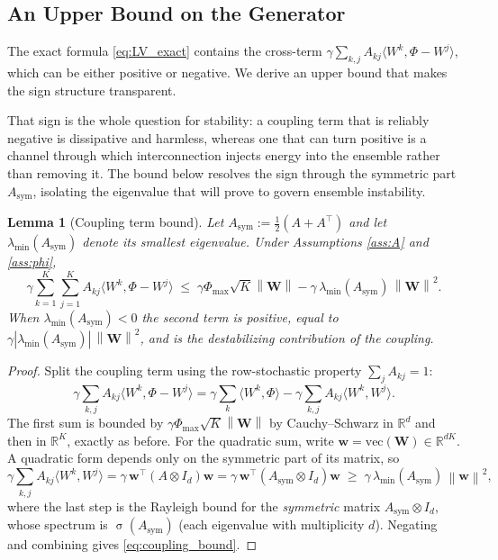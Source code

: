 \documentclass[12pt]{article}
\theoremstyle{plain}
\newtheorem{lemma}[theorem]{Lemma}
\theoremstyle{definition}
\DeclareMathOperator{\spec}{\sigma}
\newcommand{\R}{\mathbb{R}}
\newcommand{\W}{\mathbf{W}}
\newcommand{\norm}[1]{\left\lVert #1 \right\rVert}
\newcommand{\abs}[1]{\left| #1 \right|}
\newcommand{\ip}[2]{\langle #1, #2 \rangle}
\begin{document}
\subsection{An Upper Bound on the Generator}

The exact formula \eqref{eq:LV_exact} contains the cross-term
$\gamma \sum_{k,j} A_{kj}\ip{W^k}{\Phi - W^j}$, which can be either
positive or negative.  We derive an upper bound that makes the
sign structure transparent.

That sign is the whole question for stability: a coupling term that is reliably negative is dissipative and harmless, whereas one that can turn positive is a channel through which interconnection injects energy into the ensemble rather than removing it. The bound below resolves the sign through the symmetric part $A_{\mathrm{sym}}$, isolating the eigenvalue that will prove to govern ensemble instability.

\begin{lemma}[Coupling term bound]
  \label{lem:coupling_bound}
  Let $A_{\mathrm{sym}} := \tfrac{1}{2}(A + A^\top)$ and let
  $\lambda_{\min}(A_{\mathrm{sym}})$ denote its smallest eigenvalue.
  Under Assumptions \ref{ass:A} and \ref{ass:phi},
  \begin{equation}
    \gamma \sum_{k=1}^K \sum_{j=1}^K A_{kj} \ip{W^k}{\Phi - W^j}
    \;\leq\;
    \gamma \Phi_{\max} \sqrt{K} \norm{\W}
    - \gamma\, \lambda_{\min}(A_{\mathrm{sym}})\, \norm{\W}^2.
    \label{eq:coupling_bound}
  \end{equation}
  When $\lambda_{\min}(A_{\mathrm{sym}}) < 0$ the second term is
  \emph{positive}, equal to
  $\gamma\abs{\lambda_{\min}(A_{\mathrm{sym}})}\,\norm{\W}^2$, and is the
  destabilizing contribution of the coupling.
\end{lemma}

\begin{proof}
  Split the coupling term using the row-stochastic property
  $\sum_j A_{kj}=1$:
  \[
    \gamma \sum_{k,j} A_{kj} \ip{W^k}{\Phi - W^j}
    = \gamma \sum_{k} \ip{W^k}{\Phi}
      - \gamma \sum_{k,j} A_{kj} \ip{W^k}{W^j}.
  \]
  The first sum is bounded by $\gamma \Phi_{\max} \sqrt{K} \norm{\W}$
  by Cauchy--Schwarz in $\R^d$ and then in $\R^K$, exactly as before.
  For the quadratic sum, write $\mathbf{w} = \mathrm{vec}(\W) \in \R^{dK}$.
  A quadratic form depends only on the symmetric part of its matrix, so
  \[
    \gamma \sum_{k,j} A_{kj} \ip{W^k}{W^j}
    = \gamma\, \mathbf{w}^\top (A \otimes I_d) \mathbf{w}
    = \gamma\, \mathbf{w}^\top (A_{\mathrm{sym}} \otimes I_d) \mathbf{w}
    \;\geq\; \gamma\, \lambda_{\min}(A_{\mathrm{sym}})\, \norm{\mathbf{w}}^2,
  \]
  where the last step is the Rayleigh bound for the \emph{symmetric}
  matrix $A_{\mathrm{sym}} \otimes I_d$, whose spectrum is
  $\spec(A_{\mathrm{sym}})$ (each eigenvalue with multiplicity $d$).
  Negating and combining gives \eqref{eq:coupling_bound}.
\end{proof}
\end{document}
